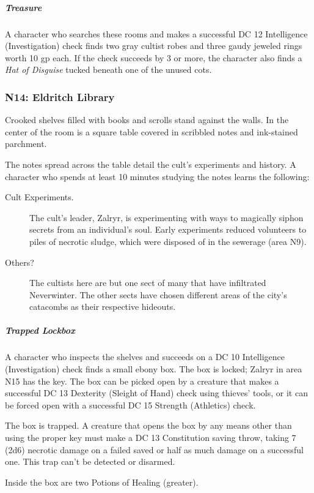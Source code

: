 \documentclass[10pt,a4paper,twoside,fancy,bg=print,twocolumn,openany,nodeprecatedcode]{dndbook}
\begin{document}
\subparagraph{Treasure}
A character who searches these rooms and makes a successful DC 12 Intelligence (Investigation) check finds two gray cultist robes and three gaudy jeweled rings worth 10 gp each. If the check succeeds by 3 or more, the character also finds a \textit{Hat of Disguise} tucked beneath one of the unused cots.

\subsubsection{N14: Eldritch Library}
\begin{DndReadAloud}{}
Crooked shelves filled with books and scrolls stand against the walls. In the center of the room is a square table covered in scribbled notes and ink-stained parchment.

\end{DndReadAloud}

The notes spread across the table detail the cult's experiments and history. A character who spends at least 10 minutes studying the notes learns the following:


\begin{description}
\item[Cult Experiments.]
The cult's leader, Zalryr, is experimenting with ways to magically siphon secrets from an individual's soul. Early experiments reduced volunteers to piles of necrotic sludge, which were disposed of in the sewerage (area N9).
\item[Others?]
The cultists here are but one sect of many that have infiltrated Neverwinter. The other sects have chosen different areas of the city's catacombs as their respective hideouts.
\end{description}

\subparagraph{Trapped Lockbox}
A character who inspects the shelves and succeeds on a DC 10 Intelligence (Investigation) check finds a small ebony box. The box is locked; Zalryr in area N15 has the key. The box can be picked open by a creature that makes a successful DC 13 Dexterity (Sleight of Hand) check using thieves' tools, or it can be forced open with a successful DC 15 Strength (Athletics) check.

The box is trapped. A creature that opens the box by any means other than using the proper key must make a DC 13 Constitution saving throw, taking 7 (2d6) necrotic damage on a failed saved or half as much damage on a successful one. This trap can't be detected or disarmed.

Inside the box are two Potions of Healing (greater).
\end{document}
